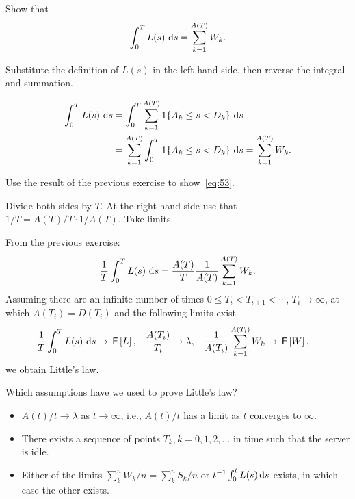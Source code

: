 \begin{exercise} [\faFlask]
  Show that 
\begin{equation*}
  \int_0^T L(s)\, \,\text{d}s  =  \sum_{k=1}^{A(T)} W_k.
\end{equation*}
\begin{hint}
  Substitute the definition of $L(s)$ in the left-hand side, then reverse the integral and summation.
\end{hint}
\begin{solution}
\begin{equation*}
  \begin{split}
  \int_0^T L(s)\, \,\text{d}s & = \int_0^T \sum_{k=1}^{A(T)} 1\{A_k \leq s < D_k\} \, \,\text{d}s \\
& =  \sum_{k=1}^{A(T)}\int_0^T  1\{A_k \leq s < D_k\} \, \,\text{d}s =  \sum_{k=1}^{A(T)} W_k.
  \end{split}
\end{equation*}
\end{solution}
\end{exercise}


\begin{exercise}
  Use the result of the previous exercise to show~\eqref{eq:53}. 
\begin{hint}
  Divide both sides by $T$. At the right-hand side use that $1/T =  A(T)/T \cdot 1/A(T)$. Take limits.
\end{hint}
\begin{solution}
From the previous exercise:
\begin{equation*}
  \frac 1 T  \int_0^T L(s)\, \,\text{d}s  = \frac{A(T)} T \frac{1}{A(T)} \sum_{k=1}^{A(T)} W_k.
\end{equation*}
Assuming there are an infinite number of times
$0\leq T_i<T_{i+1}<\cdots$, $T_i\to\infty$, at which $A(T_i) = D(T_i)$
and the following limits exist
\begin{align*}
\frac 1 T  \int_0^T L(s)\, \,\text{d}s &\to \,\mathsf{E}\left[L\right],&
\frac{A(T_i)}{T_i} &\to \lambda, &
\frac{1}{A(T_i)} \sum_{k=1}^{A(T_i)} W_k &\to \,\mathsf{E}\left[W\right],
\end{align*}
we obtain  Little's law.
\end{solution}
\end{exercise}



\begin{exercise}
 Which assumptions have we used to prove Little's law?
  \begin{solution}
    \begin{itemize}
    \item 
 $A(t)/t \to \lambda$ as $t\to \infty$, i.e., $A(t)/t$ has a limit as $t$ converges to $\infty$. 
  \item There exists a sequence of points $T_k, k=0,1,2,\ldots$ in time such that the server is idle. 
  \item Either of the limits $\sum_k^n W_k/n = \sum_k^n S_k /n $ or
    $t^{-1}\int_0^t L(s) \,\text{d}s$ exists, in which case the other exists.
    \end{itemize}
  \end{solution}
\end{exercise}

